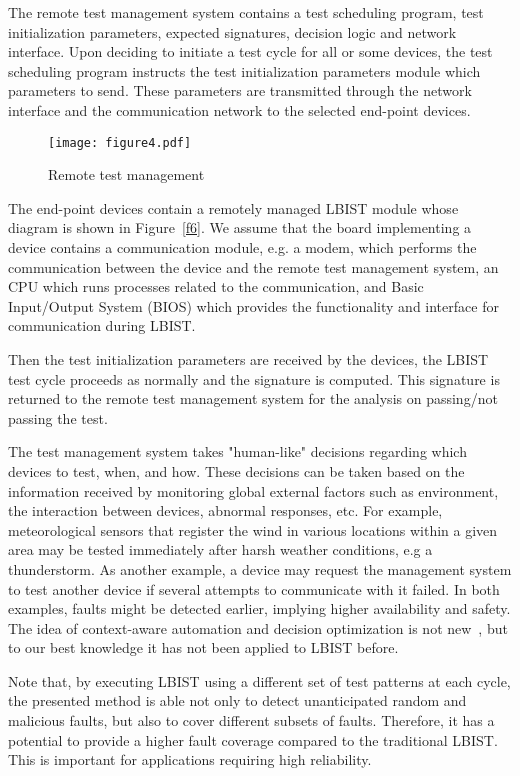 \documentclass[a4paper]{llncs}
\begin{document}
The remote test management system contains a test scheduling program, test initialization parameters, expected signatures, decision logic and network interface. Upon deciding to initiate a test cycle for all or some devices, the test scheduling program 
instructs the test initialization parameters module which parameters to send. These parameters are transmitted through the network interface and the communication network to the selected end-point devices. 



\begin{figure*}[t!]
\begin{center}
\texttt{[image: figure4.pdf]}
\caption{Remote test management}\label{f5} 
\end{center}
\end{figure*}

The end-point devices contain a remotely managed LBIST module whose diagram is shown in Figure~\ref{f6}. We assume that the board implementing a device contains a communication module, e.g. a modem, which performs the communication between the device and the remote test management system, an CPU which runs processes related to the communication, and Basic Input/Output System (BIOS) which provides the functionality and interface for communication during LBIST.

Then the test initialization parameters are received by the devices, the LBIST test cycle proceeds as normally and the signature is computed. This signature is returned to the remote test management system for the analysis on passing/not passing the test.


The test management system takes "human-like" decisions regarding which devices to test, when, and how. These decisions can be taken based on the information received  
by monitoring global external factors such as environment, the interaction between devices, abnormal responses, etc. For example, meteorological sensors that register the wind in various locations within a given area may be tested immediately after harsh weather conditions, e.g a thunderstorm. As another example, a device may request the management system to test another device if several attempts to communicate with it failed. In both examples, faults might be detected earlier, implying higher availability and safety.
The idea of context-aware automation and decision optimization is not new~\cite{WaD09}, but to our best knowledge it has not been applied to LBIST before.  

Note that, by executing LBIST using a different set of test patterns at each cycle, the presented method is able not only to detect unanticipated random and malicious faults, but also to cover different subsets of faults. Therefore, it has a potential to provide a higher fault coverage compared to the traditional LBIST. This is important for applications requiring high reliability.
\end{document}
